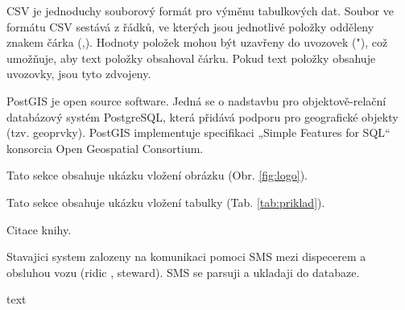 CSV je jednoduchy souborový formát pro výměnu tabulkových dat.
Soubor ve formátu CSV sestává z řádků, ve kterých jsou jednotlivé položky odděleny znakem čárka (,).
Hodnoty položek mohou být uzavřeny do uvozovek ("), což umožňuje, aby text položky obsahoval čárku.
Pokud text položky obsahuje uvozovky, jsou tyto zdvojeny.

PostGIS je open source software. Jedná se o nadstavbu pro objektově-relační databázový systém PostgreSQL, která přidává podporu pro geografické objekty (tzv. geoprvky). PostGIS implementuje specifikaci „Simple Features for SQL“ konsorcia Open Geospatial Consortium.

Tato sekce obsahuje ukázku vložení obrázku (Obr. \ref{fig:logo}).



Tato sekce obsahuje ukázku vložení tabulky (Tab. \ref{tab:priklad}).



Citace knihy. \cite{chmel}




Stavajici system zalozeny na komunikaci pomoci SMS mezi dispecerem a obsluhou vozu (ridic , steward). SMS se parsuji a ukladaji do databaze.

text

